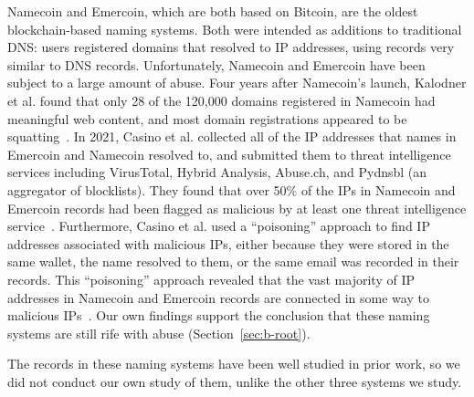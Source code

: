 Namecoin and Emercoin, which are both based on Bitcoin, are 
the oldest blockchain-based naming systems. Both were 
intended as additions to traditional DNS: users registered domains that 
resolved to IP addresses, using records very similar to DNS 
records. 
Unfortunately, Namecoin and Emercoin have been subject to a large amount of 
abuse. Four years after Namecoin's launch,
Kalodner et al. found that only 28 of the 120,000 domains 
registered in 
Namecoin had meaningful web 
content, and most domain 
registrations appeared to be 
squatting~\cite{kalodner_namecoin_2015}. 
In 2021, Casino et al. collected all of the IP addresses that 
names in Emercoin and 
Namecoin resolved to, and submitted them to threat intelligence services 
including VirusTotal, Hybrid Analysis, Abuse.ch, and Pydnsbl (an aggregator of 
blocklists). They found that over 50\% of the IPs in Namecoin and Emercoin 
records had been flagged as malicious by at least one threat intelligence 
service~\cite{casino_unearthing_2021}. Furthermore, Casino et al. used a 
``poisoning'' approach to find IP addresses associated with malicious IPs, 
either because they were stored in the same wallet, the name resolved to them, 
or the same email was recorded in their records. This ``poisoning'' approach 
revealed that the vast majority of IP addresses in Namecoin and Emercoin 
records are connected in some way to malicious 
IPs~\cite{casino_unearthing_2021}. 
Our own findings support the conclusion that these naming 
systems are still rife with abuse (Section~\ref{sec:b-root}). 

The records in these naming systems have been well studied in 
prior work, so we did not conduct our own study of them, 
unlike the other three systems we study.


